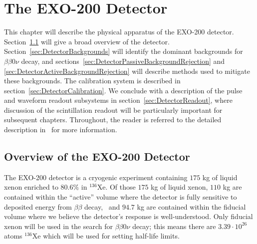 \renewcommand{\thechapter}{2}
\chapter{The EXO-200 Detector}

This chapter will describe the physical apparatus of the EXO-200 detector.  Section~\ref{sec:DetectorOverview} will give a broad overview of the detector.  Section~\ref{sec:DetectorBackgrounds} will identify the dominant backgrounds for $\beta\beta 0\nu$ decay, and sections~\ref{sec:DetectorPassiveBackgroundRejection} and \ref{sec:DetectorActiveBackgroundRejection} will describe methods used to mitigate these backgrounds.  The calibration system is described in section~\ref{sec:DetectorCalibration}.  We conclude with a description of the pulse and waveform readout subsystems in section~\ref{sec:DetectorReadout}, where discussion of the scintillation readout will be particularly important for subsequent chapters.  Throughout, the reader is referred to the detailed description in~\cite{detectorPartI} for more information.

\section{Overview of the EXO-200 Detector}\label{sec:DetectorOverview}

The EXO-200 detector is a cryogenic experiment containing $175$ kg of liquid xenon enriched to $80.6\%$ in $^{136}$Xe.  Of those $175$ kg of liquid xenon, $110$ kg are contained within the ``active'' volume where the detector is fully sensitive to deposited energy from $\beta\beta$ decay,~\cite{detectorPartI} and $94.7$ kg are contained within the fiducial volume where we believe the detector's response is well-understood.  Only fiducial xenon will be used in the search for $\beta\beta 0\nu$ decay; this means there are $3.39 \cdot 10^{26}$ atoms $^{136}$Xe which will be used for setting half-life limits.~\cite{NewEXObb0nPaper_2014}

